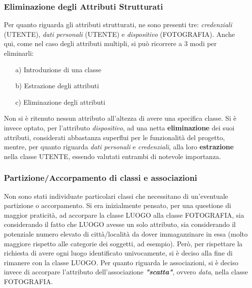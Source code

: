 \documentclass[a4paper]{article}
\begin{document}
		\vspace{20pt}	
		\subsubsection{Eliminazione degli Attributi Strutturati}
		\vspace{5pt}
		Per quanto riguarda gli attributi strutturati, ne
		sono presenti tre: \emph{credenziali} (UTENTE),\emph{
		dati personali} (UTENTE) e \emph{dispositivo}
		(FOTOGRAFIA). Anche qui, come nel caso degli
		attributi multipli, si può ricorrere a 3 modi per
		eliminarli:
		
		\begin{itemize}
			\item[a)] Introduzione di una classe
			\item[b)] Estrazione degli attributi
			\item[c)] Eliminazione degli attributi
		\end{itemize}
		Non si è ritenuto nessun attributo all'altezza di
		avere una specifica classe. Si è invece optato,
		per l'attributo \emph{dispositivo},
		ad una netta \textbf{eliminazione} dei suoi
		attributi, considerati abbastanza superflui per le
		funzionalità del
		progetto, mentre, per quanto riguarda
		\emph{dati personali} e \emph{credenziali}, alla loro
		\textbf{estrazione} nella classe UTENTE, essendo
		valutati entrambi di notevole importanza.
		
		\vspace{20pt}		    
        \subsubsection{Partizione/Accorpamento di classi e associazioni}
        \vspace{5pt}
        Non sono stati individuate particolari
        classi che
        necessitano di un'eventuale partizione o
        accorpamento. Si era inizialmente pensato, per
        una questione di maggior praticità, ad
        accorpare la classe LUOGO alla classe FOTOGRAFIA, sia
        considerando
        il fatto che LUOGO avesse un solo attributo, sia
        considerando
        il potenziale
       	numero elevato di città/località da dover
       	immagazzinare in essa (molto maggiore
       	rispetto alle categorie dei soggetti, ad esempio).
       	Però, per rispettare la richiesta di avere
       	ogni
       	luogo identificato univocamente, si è deciso alla
       	fine di
       	rimanere con la classe LUOGO. Per quanto riguarda le
       	associazioni, si è deciso invece di accorpare
       	l'attributo
       	dell'associazione
       \textbf{\emph{"scatta"}}, ovvero \emph{data}, nella
       classe
       FOTOGRAFIA.
       	
\end{document}
